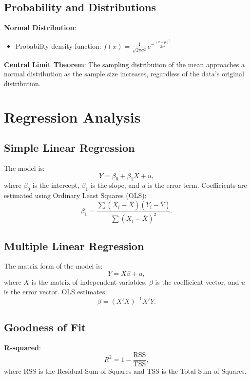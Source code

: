 \documentclass{article}
\begin{document}
\subsection{Probability and Distributions}
\textbf{Normal Distribution}:
\begin{itemize}
    \item Probability density function: $f(x) = \frac{1}{\sqrt{2\pi \sigma^2}} e^{-\frac{(x - \mu)^2}{2\sigma^2}}$
\end{itemize}
\textbf{Central Limit Theorem}:
The sampling distribution of the mean approaches a normal distribution as the sample size increases, regardless of the data's original distribution.

\section{Regression Analysis}
\subsection{Simple Linear Regression}
The model is:
\begin{equation}
    Y = \beta_0 + \beta_1X + u,
\end{equation}
where $\beta_0$ is the intercept, $\beta_1$ is the slope, and $u$ is the error term. Coefficients are estimated using Ordinary Least Squares (OLS):
\begin{equation}
    \beta_1 = \frac{\sum (X_i - \bar{X})(Y_i - \bar{Y})}{\sum (X_i - \bar{X})^2}.
\end{equation}

\subsection{Multiple Linear Regression}
The matrix form of the model is:
\begin{equation}
    Y = X\beta + u,
\end{equation}
where $X$ is the matrix of independent variables, $\beta$ is the coefficient vector, and $u$ is the error vector. OLS estimates:
\begin{equation}
    \hat{\beta} = (X'X)^{-1}X'Y.
\end{equation}

\subsection{Goodness of Fit}
\textbf{R-squared}:
\begin{equation}
    R^2 = 1 - \frac{\text{RSS}}{\text{TSS}},
\end{equation}
where RSS is the Residual Sum of Squares and TSS is the Total Sum of Squares.
\end{document}
